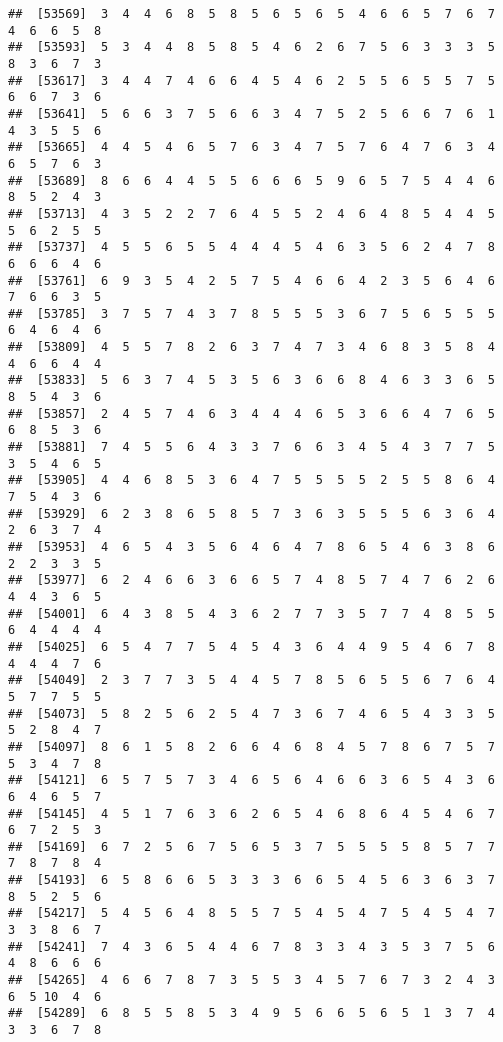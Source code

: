 \documentclass[
]{book}
\begin{document}
\begin{verbatim}
##  [53569]  3  4  4  6  8  5  8  5  6  5  6  5  4  6  6  5  7  6  7  4  6  6  5  8
##  [53593]  5  3  4  4  8  5  8  5  4  6  2  6  7  5  6  3  3  3  5  8  3  6  7  3
##  [53617]  3  4  4  7  4  6  6  4  5  4  6  2  5  5  6  5  5  7  5  6  6  7  3  6
##  [53641]  5  6  6  3  7  5  6  6  3  4  7  5  2  5  6  6  7  6  1  4  3  5  5  6
##  [53665]  4  4  5  4  6  5  7  6  3  4  7  5  7  6  4  7  6  3  4  6  5  7  6  3
##  [53689]  8  6  6  4  4  5  5  6  6  6  5  9  6  5  7  5  4  4  6  8  5  2  4  3
##  [53713]  4  3  5  2  2  7  6  4  5  5  2  4  6  4  8  5  4  4  5  5  6  2  5  5
##  [53737]  4  5  5  6  5  5  4  4  4  5  4  6  3  5  6  2  4  7  8  6  6  6  4  6
##  [53761]  6  9  3  5  4  2  5  7  5  4  6  6  4  2  3  5  6  4  6  7  6  6  3  5
##  [53785]  3  7  5  7  4  3  7  8  5  5  5  3  6  7  5  6  5  5  5  6  4  6  4  6
##  [53809]  4  5  5  7  8  2  6  3  7  4  7  3  4  6  8  3  5  8  4  4  6  6  4  4
##  [53833]  5  6  3  7  4  5  3  5  6  3  6  6  8  4  6  3  3  6  5  8  5  4  3  6
##  [53857]  2  4  5  7  4  6  3  4  4  4  6  5  3  6  6  4  7  6  5  6  8  5  3  6
##  [53881]  7  4  5  5  6  4  3  3  7  6  6  3  4  5  4  3  7  7  5  3  5  4  6  5
##  [53905]  4  4  6  8  5  3  6  4  7  5  5  5  5  2  5  5  8  6  4  7  5  4  3  6
##  [53929]  6  2  3  8  6  5  8  5  7  3  6  3  5  5  5  6  3  6  4  2  6  3  7  4
##  [53953]  4  6  5  4  3  5  6  4  6  4  7  8  6  5  4  6  3  8  6  2  2  3  3  5
##  [53977]  6  2  4  6  6  3  6  6  5  7  4  8  5  7  4  7  6  2  6  4  4  3  6  5
##  [54001]  6  4  3  8  5  4  3  6  2  7  7  3  5  7  7  4  8  5  5  6  4  4  4  4
##  [54025]  6  5  4  7  7  5  4  5  4  3  6  4  4  9  5  4  6  7  8  4  4  4  7  6
##  [54049]  2  3  7  7  3  5  4  4  5  7  8  5  6  5  5  6  7  6  4  5  7  7  5  5
##  [54073]  5  8  2  5  6  2  5  4  7  3  6  7  4  6  5  4  3  3  5  5  2  8  4  7
##  [54097]  8  6  1  5  8  2  6  6  4  6  8  4  5  7  8  6  7  5  7  5  3  4  7  8
##  [54121]  6  5  7  5  7  3  4  6  5  6  4  6  6  3  6  5  4  3  6  6  4  6  5  7
##  [54145]  4  5  1  7  6  3  6  2  6  5  4  6  8  6  4  5  4  6  7  6  7  2  5  3
##  [54169]  6  7  2  5  6  7  5  6  5  3  7  5  5  5  5  8  5  7  7  7  8  7  8  4
##  [54193]  6  5  8  6  6  5  3  3  3  6  6  5  4  5  6  3  6  3  7  8  5  2  5  6
##  [54217]  5  4  5  6  4  8  5  5  7  5  4  5  4  7  5  4  5  4  7  3  3  8  6  7
##  [54241]  7  4  3  6  5  4  4  6  7  8  3  3  4  3  5  3  7  5  6  4  8  6  6  6
##  [54265]  4  6  6  7  8  7  3  5  5  3  4  5  7  6  7  3  2  4  3  6  5 10  4  6
##  [54289]  6  8  5  5  8  5  3  4  9  5  6  6  5  6  5  1  3  7  4  3  3  6  7  8

\end{verbatim}
\end{document}
